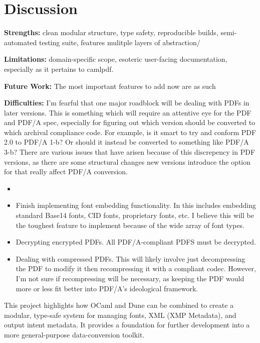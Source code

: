 \documentclass[11pt]{article}
\begin{document}
\section*{Discussion}
\textbf{Strengths:} clean modular structure, type safety, reproducible builds, semi-automated testing suite, features mulitple layers of abstraction/  

\textbf{Limitations:} domain-specific scope, esoteric user-facing documentation, especially as it pertains to camlpdf.  

\textbf{Future Work:} The most important features to add now are as such

\textbf{Difficulties:} I'm fearful that one major roadblock will be dealing with PDFs in later versions. This is something which will require an attentive eye for the PDF and PDF/A spec, especially for figuring out which version should be converted to which archival compliance code. For example, is it smart to try and conform PDF 2.0 to PDF/A 1-b? Or should it instead be converted to something like PDF/A 3-b? There are various issues that have arisen because of this discrepency in PDF versions, as there are some structural changes new versions introduce the option for that really affect PDF/A conversion. 
\begin{itemize}
  \item 
  \item Finish implementing font embedding functionality. In this includes embedding standard Base14 fonts, CID fonts, proprietary fonts, etc. I believe this will be the toughest feature to implement because of the wide array of font types. 
  \item Decrypting encrypted PDFs. All PDF/A-compliant PDFS must be decrypted.
  \item Dealing with compressed PDFs. This will likely involve just decompressing the PDF to modify it then recompressing it with a compliant codec. However, I'm not sure if recompressing will be necessary, as keeping the PDF would more or less fit better into PDF/A's ideological framework.
\end{itemize}
  

This project highlights how OCaml and Dune can be combined to create a modular, type-safe system for managing fonts, XML (XMP Metadata), and output intent metadata. It provides a foundation for further development into a more general-purpose data-conversion toolkit.

\end{document}
